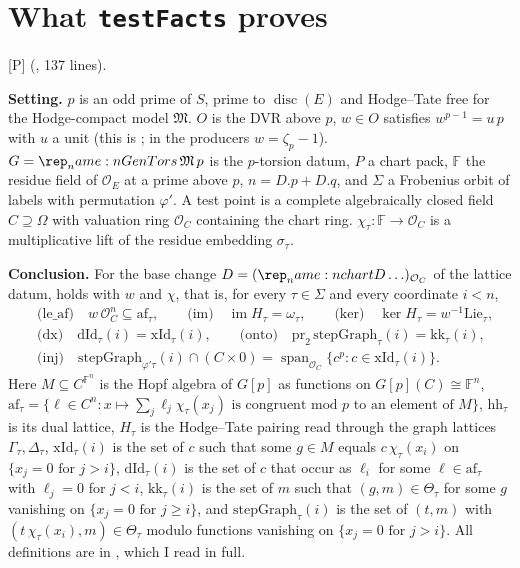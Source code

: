 \documentclass[11pt]{article}
\newcommand{\mP}{\textsf{[P]}}
\newcommand{\cO}{\mathcal O}
\newcommand{\Fq}{\mathbb F}
\theoremstyle{remark}
\begin{document}
\section{What \texttt{testFacts} proves}\label{sec:top}

\mP{}  (, 137 lines).

\textbf{Setting.} $p$ is an odd prime of $S$, prime to $\operatorname{disc}(E)$ and Hodge--Tate free for the Hodge-compact model $\mathfrak M$. $O$ is the DVR above $p$, $w\in O$ satisfies $w^{p-1}=u\,p$ with $u$ a unit (this is ; in the producers $w=\zeta_p-1$). $G=\lean{GenTors}\,\mathfrak M\,p$ is the $p$-torsion datum, $P$ a chart pack, $\Fq$ the residue field of $\cO_E$ at a prime above $p$, $n=D.p+D.q$, and $\Sigma$ a Frobenius orbit of labels with permutation $\varphi'$. A test point is a complete algebraically closed field $C\supseteq\Omega$ with valuation ring $\cO_C$ containing the chart ring. $\chi_\tau:\Fq\to\cO_C$ is a multiplicative lift of the residue embedding $\sigma_\tau$.

\textbf{Conclusion.} For the base change $D=(\lean{chartD}\ldots)_{\cO_C}$ of the lattice datum,  holds with $w$ and $\chi$, that is, for every $\tau\in\Sigma$ and every coordinate $i<n$,
\begin{align*}
&\text{(le\_af)}\quad w\,\cO_C^n\subseteq \mathrm{af}_\tau,\qquad
\text{(im)}\quad \operatorname{im}H_\tau=\omega_\tau,\qquad
\text{(ker)}\quad \ker H_\tau=w^{-1}\mathrm{Lie}_\tau,\\
&\text{(dx)}\quad \mathrm{dId}_\tau(i)=\mathrm{xId}_\tau(i),\qquad
\text{(onto)}\quad \mathrm{pr}_2\,\mathrm{stepGraph}_\tau(i)=\mathrm{kk}_\tau(i),\\
&\text{(inj)}\quad \mathrm{stepGraph}_{\varphi'\tau}(i)\cap(C\times 0)=\operatorname{span}_{\cO_C}\{c^p : c\in\mathrm{xId}_\tau(i)\}.
\end{align*}
Here $M\subseteq C^{\Fq^n}$ is the Hopf algebra of $G[p]$ as functions on $G[p](C)\cong\Fq^n$, $\mathrm{af}_\tau=\{\ell\in C^n : x\mapsto\sum_j\ell_j\chi_\tau(x_j)\text{ is congruent mod }p\text{ to an element of }M\}$, $\mathrm{hh}_\tau$ is its dual lattice, $H_\tau$ is the Hodge--Tate pairing read through the graph lattices $\Gamma_\tau,\Delta_\tau$, $\mathrm{xId}_\tau(i)$ is the set of $c$ such that some $g\in M$ equals $c\,\chi_\tau(x_i)$ on $\{x_j=0\text{ for }j>i\}$, $\mathrm{dId}_\tau(i)$ is the set of $c$ that occur as $\ell_i$ for some $\ell\in\mathrm{af}_\tau$ with $\ell_j=0$ for $j<i$, $\mathrm{kk}_\tau(i)$ is the set of $m$ such that $(g,m)\in\Theta_\tau$ for some $g$ vanishing on $\{x_j=0\text{ for }j\ge i\}$, and $\mathrm{stepGraph}_\tau(i)$ is the set of $(t,m)$ with $(t\,\chi_\tau(x_i),m)\in\Theta_\tau$ modulo functions vanishing on $\{x_j=0\text{ for }j>i\}$. All definitions are in , which I read in full.
\end{document}
